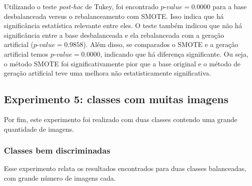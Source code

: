 
Utilizando o teste \textit{post-hoc} de Tukey, foi encontrado $\textit{p-value} = 0.0000$ para a base desbalanceada versus o rebalanceamento com SMOTE. Isso indica que há significância estatística relevante entre eles. O teste também indicou que não há significância entre a base desbalanceada e ela rebalanceada com a geração artificial ($\textit{p-value} = 0.9858$). Além disso, se comparados o SMOTE e a geração artificial temos $\textit{p-value} = 0.0000$, indicando que há diferença significante. Ou seja, o método SMOTE foi significativamente pior que a base original e o método de geração artificial teve uma melhora não estatisticamente significativa.

\FloatBarrier
\subsection{Experimento 5: classes com muitas imagens}

Por fim, este experimento foi realizado com duas classes contendo uma grande quantidade de imagens.

\subsubsection{Classes bem discriminadas}
Esse experimento relata os resultados encontrados para duas classes balanceadas, com grande número de imagens cada.


